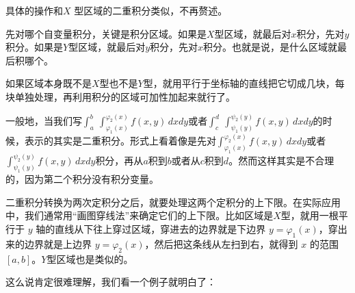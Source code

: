 \begin{center}
\end{center}

具体的操作和$X$ 型区域的二重积分类似，不再赘述。

先对哪个自变量积分，关键是积分区域。如果是$ X $型区域，就最后对$x$积分，先对$y$积分。如果是$ Y $型区域，就最后对$y$积分，先对$x$积分。也就是说，是什么区域就最后积哪个。

如果区域本身既不是$ X $型也不是$ Y $型，就用平行于坐标轴的直线把它切成几块，每块单独处理，再利用积分的区域可加性加起来就行了。

一般地，当我们写$\int_a^b\ \int_{\varphi_1(x)}^{\varphi_2(x)} f(x,y)\,dxdy$或者$\int_c^d\ \int_{\psi_1(y)}^{\psi_2(y)} f(x,y)\,dxdy$的时候，表示的其实是二重积分。形式上看着像是先对$\int_{\varphi_1(x)}^{\varphi_2(x)} f(x,y)\,dxdy$或者$\int_{\psi_1(y)}^{\psi_2(y)} f(x,y)\,dxdy$积分，再从$a$积到$b$或者从$c$积到$d$。然而这样其实是不合理的，因为第二个积分没有积分变量。

二重积分转换为两次定积分之后，就要处理这两个定积分的上下限。在实际应用中，我们通常用“画图穿线法”来确定它们的上下限。比如区域是$ X $型，就用一根平行于 \(y\) 轴的直线从下往上穿过区域，穿进去的边界就是下边界 \(y=\varphi_1(x)\)，穿出来的边界就是上边界 \(y=\varphi_2(x)\)，然后把这条线从左扫到右，就得到 \(x\) 的范围 \([a,b]\)。$Y $型区域也是类似的。

这么说肯定很难理解，我们看一个例子就明白了：

